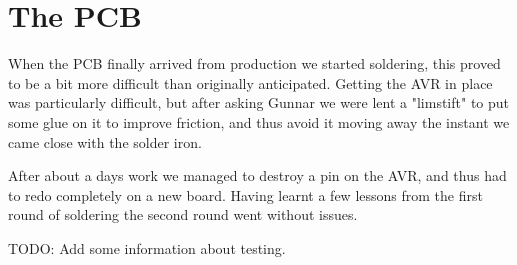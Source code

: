 \section {The PCB}

When the PCB finally arrived from production we started soldering, this proved to be a bit
more difficult than originally anticipated. Getting the AVR in place was particularly difficult,
but after asking Gunnar we were lent a "limstift" to put some glue on it to improve friction, and
thus avoid it moving away the instant we came close with the solder iron.

After about a days work we managed to destroy a pin on the AVR, and thus had to redo completely on
a new board. Having learnt a few lessons from the first round of soldering the second round went without
issues.

TODO: Add some information about testing.

